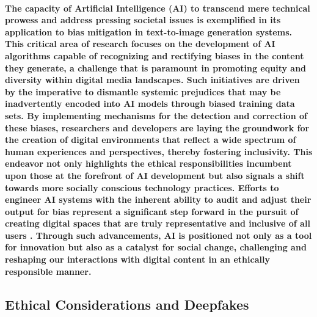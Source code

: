 \documentclass[11pt,a4paper,oneside]{report}
\begin{document}
\paragraph{The capacity of Artificial Intelligence (AI) to transcend mere technical prowess and address pressing societal issues is exemplified in its application to bias mitigation in text-to-image generation systems. This critical area of research focuses on the development of AI algorithms capable of recognizing and rectifying biases in the content they generate, a challenge that is paramount in promoting equity and diversity within digital media landscapes. Such initiatives are driven by the imperative to dismantle systemic prejudices that may be inadvertently encoded into AI models through biased training data sets. By implementing mechanisms for the detection and correction of these biases, researchers and developers are laying the groundwork for the creation of digital environments that reflect a wide spectrum of human experiences and perspectives, thereby fostering inclusivity. This endeavor not only highlights the ethical responsibilities incumbent upon those at the forefront of AI development but also signals a shift towards more socially conscious technology practices. Efforts to engineer AI systems with the inherent ability to audit and adjust their output for bias represent a significant step forward in the pursuit of creating digital spaces that are truly representative and inclusive of all users \cite{esposito2023mitigating}. Through such advancements, AI is positioned not only as a tool for innovation but also as a catalyst for social change, challenging and reshaping our interactions with digital content in an ethically responsible manner.}

\subsection{Ethical Considerations and Deepfakes}
\end{document}
